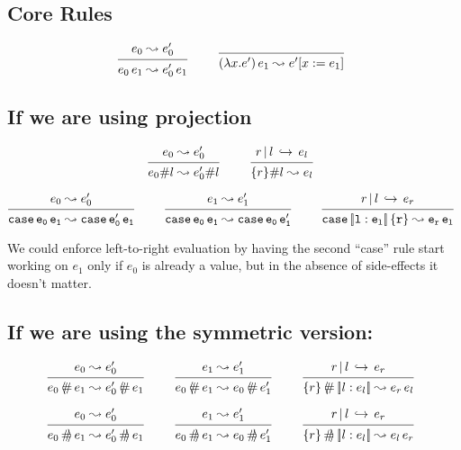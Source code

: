 \documentclass{article}
\newcommand{\define}{::=}
\newcommand{\variant}[1]{[\!|#1|\!]}
\newcommand{\case}[2]{\tt{case}\,#1\,#2}
\newcommand{\app}[2]{#1\,#2}
\newcommand{\lam}[2]{\lambda #1 . #2}
\newcommand{\projFun}{\,\langle\!\!\#\,}
\newcommand{\projArg}{\,\#\!\!\rangle\,}
\newcommand{\haslbltm}[3]{#1\,|\,#2\,\hookrightarrow\, #3}
\newcommand{\step}[2]{#1 \leadsto #2}
\newcommand{\deduct}[3][]
{
  \begin{prooftree}
    \hypo{#2}
    \infer1[\text{#1}]{#3}
  \end{prooftree}
}
\begin{document}


\subsection{Core Rules}
\[
\deduct
    {\step{e_0}{e'_0}}
    {\step{\app{e_0}{e_1}}{\app{e'_0}{e_1}}}
    {}
\qquad
\deduct
    {}
    {\step{\app{(\lam{x}{e'})}{e_1}}{e'[x:=e_1]}}
    {}
\]

\subsection{If we are using projection}

\[
\deduct
    {\step{e_0}{e'_0}}
    {\step{e_0\#l}{e'_0\#l}}
    {}
\qquad
\deduct
    {\haslbltm{r}{l}{e_l}}
    {\step{\{r\}\#l}{e_l}}
    {}
\]

\[
\deduct
    {\step{e_0}{e'_0}}
    {\step{\case{e_0}{e_1}}{\case{e'_0}{e_1}}}
    {}
\qquad
\deduct
    {\step{e_1}{e'_1}}
    {\step{\case{e_0}{e_1}}{\case{e_0}{e'_1}}}
    {}
\qquad
\deduct
    {\haslbltm{r}{l}{e_r}}
    {\step{\case{\variant{l:e_l}}{\{r\}}}{\app{e_r}{e_l}}}
    {}
\]

We could enforce left-to-right evaluation by having the second ``case'' rule
start working on $e_1$ only if $e_0$
is already a value, but in the absence of side-effects it doesn't matter.

\subsection{If we are using the symmetric version:}

\[
\deduct
   {\step{e_0}{e'_0}}
   {\step{e_0 \projFun e_1}{e'_0 \projFun e_1}}
   {}
\qquad
\deduct
   {\step{e_1}{e'_1}}
   {\step{e_0 \projFun e_1}{e_0 \projFun e'_1}}
   {}
\qquad
\deduct
   {\haslbltm{r}{l}{e_r}}
   {\step{\{r\} \projFun \variant{l:e_l}}{\app{e_r}{e_l}}}
   {}
\]

\[
\deduct
   {\step{e_0}{e'_0}}
   {\step{e_0 \projArg e_1}{e'_0 \projArg e_1}}
   {}
\qquad
\deduct
   {\step{e_1}{e'_1}}
   {\step{e_0 \projArg e_1}{e_0 \projArg e'_1}}
   {}
\qquad
\deduct
   {\haslbltm{r}{l}{e_r}}
   {\step{\{r\} \projArg \variant{l:e_l}}{\app{e_l}{e_r}}}
   {}
\]
\end{document}
